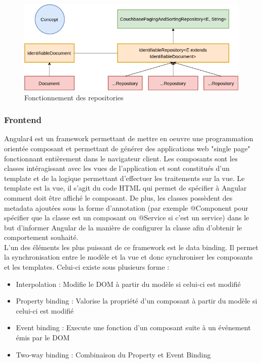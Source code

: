 \begin{figure}[h!]
	\includegraphics[scale=0.55]{images/travailBP1818/piecesJustif/repository.png}
	\centering
	\caption{Fonctionnement des repositories}
	\label{repository}
\end{figure}

\subsubsection{Frontend}
\label{frontendArchi}

	Angular4 est un framework permettant de mettre en oeuvre une programmation orientée composant et permettant de générer des applications web "single page" fonctionnant entièrement dans le navigateur client. Les composants sont les classes intéragissant avec les vues de l'application et sont constitués d'un template et de la logique permettant d'effectuer les traitements sur la vue. Le template est la vue, il s'agit du code HTML qui permet de spécifier à Angular comment doit être affiché le composant. De plus, les classes possèdent des metadata ajoutées sous la forme d'annotation (par exemple @Component pour spécifier que la classe est un composant ou @Service si c'est un service) dans le but d'informer Angular de la manière de configurer la classe afin d'obtenir le comportement souhaité. \\
	
	L'un des éléments les plus puissant de ce framework est le data binding. Il permet la synchronisation entre le modèle et la vue et donc synchroniser les composants et les templates. Celui-ci existe sous plusieurs forme :
	\begin{itemize}
		\item Interpolation : Modifie le DOM à partir du modèle si celui-ci est modifié
		\item Property binding : Valorise la propriété d'un composant à partir du modèle si celui-ci est modifié
		\item Event binding : Execute une fonction d'un composant suite à un événement émis par le DOM
		\item Two-way binding : Combinaison du Property et Event Binding \\
	\end{itemize}

